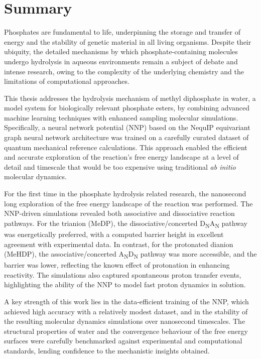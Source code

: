 \chapter*{Summary}
Phosphates are fundamental to life, underpinning the storage and transfer of energy and the stability of genetic material in all living organisms. Despite their ubiquity, the detailed mechanisms by which phosphate-containing molecules undergo hydrolysis in aqueous environments remain a subject of debate and intense research, owing to the complexity of the underlying chemistry and the limitations of computational approaches.

This thesis addresses the hydrolysis mechanism of methyl diphosphate in water, a model system for biologically relevant phosphate esters, by combining advanced machine learning techniques with enhanced sampling molecular simulations. Specifically, a neural network potential (NNP) based on the NequIP equivariant graph neural network architecture was trained on a carefully curated dataset of quantum mechanical reference calculations. This approach enabled the efficient and accurate exploration of the reaction's free energy landscape at a level of detail and timescale that would be too expensive using traditional \textit{ab initio} molecular dynamics.

For the first time in the phosphate hydrolysis related research, the nanosecond long exploration of the free energy landscape of the reaction was performed. The NNP-driven simulations revealed both associative and dissociative reaction pathways. For the trianion (MeDP), the dissociative/concerted D\textsubscript{N}A\textsubscript{N} pathway was energetically preferred, with a computed barrier height in excellent agreement with experimental data. In contrast, for the protonated dianion (MeHDP), the associative/concerted A\textsubscript{N}D\textsubscript{N} pathway was more accessible, and the barrier was lower, reflecting the known effect of protonation in enhancing reactivity. The simulations also captured spontaneous proton transfer events, highlighting the ability of the NNP to model fast proton dynamics in solution.

A key strength of this work lies in the data-efficient training of the NNP, which achieved high accuracy with a relatively modest dataset, and in the stability of the resulting molecular dynamics simulations over nanosecond timescales. The structural properties of water and the convergence behaviour of the free energy surfaces were carefully benchmarked against experimental and computational standards, lending confidence to the mechanistic insights obtained.

